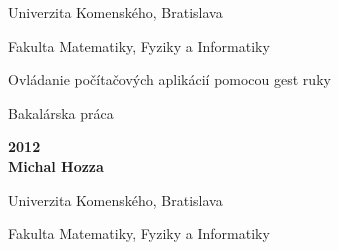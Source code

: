 \documentclass[a4paper,12pt,openany,oneside]{book} %
\renewcommand\baselinestretch{1.3} %
\def\mftitle{Ovládanie počítačových aplikácií pomocou gest ruky}
\def\mfthesistype{Bakalárska práca}
\def\mfauthor{Michal Hozza}
\def\mfadvisor{RNDr. Marek Nagy}
\def\mfdate{2012}
\def\mfuniversity{Univerzita Komenského, Bratislava}
\def\mffakulta{Fakulta Matematiky, Fyziky a Informatiky}
\begin{document}
\frontmatter

\thispagestyle{empty}

\noindent
\begin{center}
\begin{minipage}{0.8\textwidth}
\centerline{\renewcommand\baselinestretch{1.3} \LARGE\sc\mfuniversity}
\centerline{\sc\mffakulta}
\end{minipage}
\end{center}

\vfill
\begin{center}
\begin{minipage}{1\textwidth}
\bigskip\bigskip
\begin{center}
\linespread{1}\LARGE\sc\mftitle
\end{center}
\smallskip
\centerline{\mfthesistype}
\bigskip
\bigskip
\bigskip\bigskip
\end{minipage}
\end{center}
\vfill
{\bf\mfdate\\
\indent\mfauthor}
\eject %


\thispagestyle{empty}

\noindent
\begin{center}
\begin{minipage}{0.8\textwidth}
\centerline{\LARGE\sc\mfuniversity}
\centerline{\sc\mffakulta}
\end{minipage}
\end{center}
\end{document}
